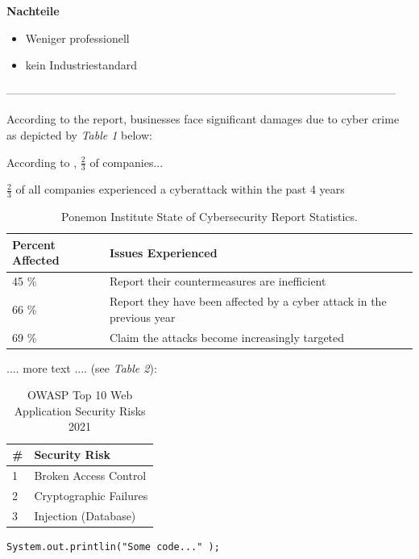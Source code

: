 \textbf{Nachteile}
\begin{itemize}
	\item Weniger professionell
	\item kein Industriestandard \cite{TinkercadReviews}
\end{itemize}



--------------------------------------------------------------------------------------------------------

According to the report, businesses face significant damages due to cyber crime as depicted by \emph{Table 1} below: 

According to \textcite{embroker}, $\frac{2}{3}$ of companies...

$\frac{2}{3}$ of all companies experienced a cyberattack within the past 4 years \parencite{embroker}

\begin{table} [H]
	\begin{tabular}{ |p{2cm}|p{11.0cm}| }
		\hline
		\textbf{Percent Affected}& \textbf{Issues Experienced}\\
		\hline
		45 \% & Report their countermeasures are inefficient  \\ 
		66 \% & Report they have been affected by a cyber attack in the previous year  \\  
		69 \% & Claim the attacks become increasingly targeted \\  
		\hline
	\end{tabular}
	\caption{\label{tab:CyberSecReport}Ponemon Institute State of Cybersecurity Report Statistics.}
\end{table}

.... more text ....  (see \emph{Table 2}):

\begin{table} [H]
	\begin{tabular}{ |p{2cm}| p{11.0cm}| }
		\hline
		\textbf{\#}& \textbf{Security Risk}\\
		\hline
		1 & Broken Access Control \\
		2 & Cryptographic Failures \\
		3 & Injection (Database) \\
		\hline
	\end{tabular}
	\caption{\label{tab:OWASP2021} OWASP Top 10 Web Application Security Risks 2021}
\end{table}

\begin{lstlisting}
System.out.printlin("Some code..." );
\end{lstlisting}



